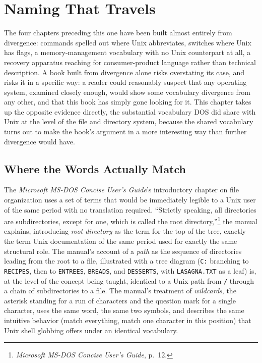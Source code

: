 \documentclass[11pt]{book}
\begin{document}
\chapter{Naming That Travels}

The four chapters preceding this one have been built almost entirely from divergence: commands spelled out where Unix abbreviates, switches where Unix has flags, a memory-management vocabulary with no Unix counterpart at all, a recovery apparatus reaching for consumer-product language rather than technical description. A book built from divergence alone risks overstating its case, and risks it in a specific way: a reader could reasonably suspect that any operating system, examined closely enough, would show some vocabulary divergence from any other, and that this book has simply gone looking for it. This chapter takes up the opposite evidence directly, the substantial vocabulary DOS did share with Unix at the level of the file and directory system, because the shared vocabulary turns out to make the book's argument in a more interesting way than further divergence would have.

\section{Where the Words Actually Match}

The \emph{Microsoft MS-DOS Concise User's Guide}'s introductory chapter on file organization uses a set of terms that would be immediately legible to a Unix user of the same period with no translation required. \enquote{Strictly speaking, all directories are subdirectories, except for one, which is called the root directory,}\footnote{\emph{Microsoft MS-DOS Concise User's Guide}, p.\ 12.} the manual explains, introducing \emph{root directory} as the term for the top of the tree, exactly the term Unix documentation of the same period used for exactly the same structural role. The manual's account of a \emph{path} as the sequence of directories leading from the root to a file, illustrated with a tree diagram (\texttt{C:} branching to \texttt{RECIPES}, then to \texttt{ENTREES}, \texttt{BREADS}, and \texttt{DESSERTS}, with \texttt{LASAGNA.TXT} as a leaf) is, at the level of the concept being taught, identical to a Unix path from \texttt{/} through a chain of subdirectories to a file. The manual's treatment of \emph{wildcards}, the asterisk standing for a run of characters and the question mark for a single character, uses the same word, the same two symbols, and describes the same intuitive behavior (match everything, match one character in this position) that Unix shell globbing offers under an identical vocabulary.
\end{document}
